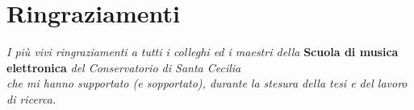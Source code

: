 
\chapter*{Ringraziamenti}


\textit{I più vivi ringraziamenti a tutti i colleghi ed i maestri della} \textbf{Scuola di musica elettronica} \textit{del Conservatorio di Santa Cecilia \\ che mi hanno supportato (e sopportato), durante la stesura della tesi e del lavoro di ricerca.}


